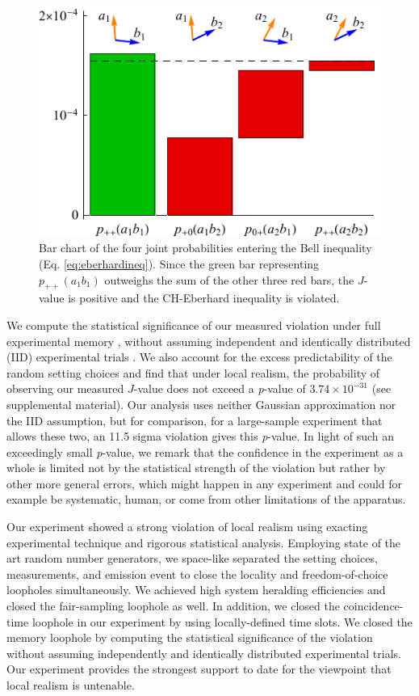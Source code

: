 \documentclass[superscriptaddress,twocolumn]{revtex4-1}
\begin{document}
\begin{figure}[t]
	\includegraphics{Fig3v11.pdf}
	\caption{Bar chart of the four joint probabilities entering the Bell  inequality (Eq. \ref{eq:eberhardineq}). Since the green bar representing $p_{++}(a_1 b_1)$  outweighs the sum of the other three red bars, the $J$-value is positive and the CH-Eberhard inequality is violated.  \label{fig:histogram}}
\end{figure}



We compute the statistical significance of our measured violation under full experimental memory \cite{Barrett2002,Gill2003_1,Gill2003_2}, without assuming independent and identically distributed (IID) experimental trials \cite{Kofler2015}. We also account for the excess  predictability of the random setting choices and find that under local realism, the probability of observing our measured $J$-value does not exceed a \textit{p}-value of $3.74\times 10^{-31}$ (see supplemental material). Our analysis uses neither Gaussian approximation nor the IID assumption, but for comparison, for a large-sample experiment that allows these two, an 11.5 sigma violation gives this \textit{p}-value. In light of such an exceedingly small \textit{p}-value, we remark that the confidence in the experiment as a whole is limited not by the statistical strength of the violation but rather by other more general errors, which might happen in any experiment and could for example be systematic, human, or come from other limitations of the apparatus.
	

Our experiment showed a strong violation of local realism using exacting experimental technique and rigorous statistical analysis. Employing state of the art random number generators, we space-like separated the setting choices, measurements, and emission event to close the locality and freedom-of-choice loopholes simultaneously. We achieved high system heralding efficiencies and closed the fair-sampling loophole as well. In addition, we closed the coincidence-time loophole in our experiment by using locally-defined time slots. We closed the memory loophole by computing the statistical significance of the violation without assuming independently and identically distributed experimental trials. Our experiment provides the strongest support to date for the viewpoint that local realism is untenable.
\end{document}

